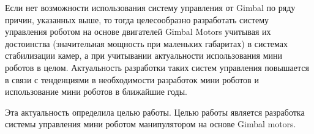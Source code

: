 Если нет возможности использования систему управления от Gimbal по ряду причин, указанных выше, то тогда целесообразно разработать систему управления роботом на основе двигателей Gimbal Motors учитывая их достоинства (значительная мощность при маленьких габаритах) в системах стабилизации камер, а при учитывании актуальности использования мини роботов в целом. Актуальность разработки таких систем управления повышается в связи с тенденциями в необходимости разработок мини роботов и использование мини роботов в ближайшие годы.

Эта актуальность определила целью работы. Целью работы является разработка системы управления мини роботом манипулятором на основе Gimbal motors.